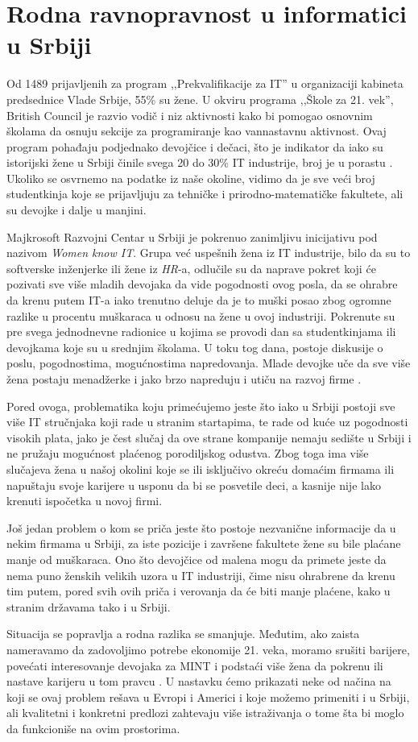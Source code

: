 \section{Rodna ravnopravnost u informatici u Srbiji}
\label{sec:usrbiji}
Od 1489 prijavljenih za program ,,Prekvalifikacije za IT'' u organizaciji kabineta predsednice Vlade Srbije, 55\% su žene. U okviru programa ,,Škole za 21. vek'', British Council je razvio vodič i niz aktivnosti kako bi pomogao osnovnim školama da osnuju sekcije za programiranje kao vannastavnu aktivnost. Ovaj program pohađaju podjednako devojčice i dečaci, što je indikator da iako su istorijski žene u Srbiji činile svega 20 do 30\% IT industrije, broj je u porastu \cite{veb1}. Ukoliko se osvrnemo na podatke iz naše okoline, vidimo da je sve veći broj studentkinja koje se prijavljuju za tehničke i prirodno-matematičke fakultete, ali su devojke i dalje u manjini. 

Majkrosoft Razvojni Centar u Srbiji je pokrenuo zanimljivu inicijativu pod nazivom \emph{Women know IT}. Grupa već uspešnih žena iz IT industrije, bilo da su to softverske inženjerke ili žene iz \emph{HR}-a, odlučile su da naprave pokret koji će pozivati sve više mladih devojaka da vide pogodnosti ovog posla, da se ohrabre da krenu putem IT-a iako trenutno deluje da je to muški posao zbog ogromne razlike u procentu muškaraca u odnosu na žene u ovoj industriji. Pokrenute su pre svega jednodnevne radionice u kojima se provodi dan sa studentkinjama ili devojkama koje su u srednjim školama. U toku tog dana, postoje diskusije o poslu, pogodnostima, mogućnostima napredovanja. Mlade devojke uče da sve više žena postaju menadžerke i jako brzo napreduju i utiču na razvoj firme \cite{veb3}.

Pored ovoga, problematika koju primećujemo jeste što iako u Srbiji postoji sve više IT stručnjaka koji rade u stranim startapima, te rade od kuće uz pogodnosti visokih plata, jako je čest slučaj da ove strane kompanije nemaju sedište u Srbiji i ne pružaju mogućnost plaćenog porodiljskog odustva. Zbog toga ima više slučajeva žena u našoj okolini koje se ili isključivo okreću domaćim firmama ili napuštaju svoje karijere u usponu da bi se posvetile deci, a kasnije nije lako krenuti ispočetka u novoj firmi.

Još jedan problem o kom se priča jeste što postoje nezvanične informacije da u nekim firmama u Srbiji, za iste pozicije i završene fakultete žene su bile plaćane manje od muškaraca. Ono što devojčice od malena mogu da primete jeste da nema puno ženskih velikih uzora u IT industriji, čime nisu ohrabrene da krenu tim putem, pored svih ovih priča i verovanja da će biti manje plaćene, kako u stranim državama tako i u Srbiji.

Situacija se popravlja a rodna razlika se smanjuje. Međutim, ako zaista nameravamo da zadovoljimo potrebe ekonomije 21. veka, moramo srušiti barijere, povećati interesovanje devojaka za MINT i podstaći više žena da pokrenu ili nastave karijeru u tom pravcu \cite{veb2}. U nastavku ćemo prikazati neke od načina na koji se ovaj problem rešava u Evropi i Americi i koje možemo primeniti i u Srbiji, ali kvalitetni i konkretni predlozi zahtevaju više istraživanja o tome šta bi moglo da funkcioniše na ovim prostorima.
